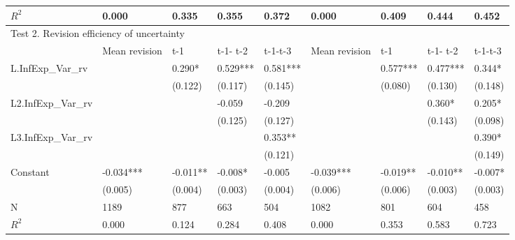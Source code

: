 \documentclass[]{article}
\begin{document}
\begin{adjustbox}{angle=90}
\begin{tabular}{lllllllll}
		$R^2$                  & 0.000         & 0.335     & 0.355    & 0.372    & 0.000         & 0.409     & 0.444     & 0.452     \\
		\hline 
		\multicolumn{9}{l}{Test 2. Revision efficiency of uncertainty}                                                            \\
		\hline 
		& Mean revision & t-1       & t-1- t-2 & t-1-t-3  & Mean revision & t-1       & t-1- t-2  & t-1-t-3   \\
		\hline 
		L.InfExp\_Var\_rv   &               & 0.290*    & 0.529*** & 0.581*** &               & 0.577***  & 0.477***  & 0.344*    \\
		&               & (0.122)   & (0.117)  & (0.145)  &               & (0.080)   & (0.130)   & (0.148)   \\
		L2.InfExp\_Var\_rv  &               &           & -0.059   & -0.209   &               &           & 0.360*    & 0.205*    \\
		&               &           & (0.125)  & (0.127)  &               &           & (0.143)   & (0.098)   \\
		L3.InfExp\_Var\_rv  &               &           &          & 0.353**  &               &           &           & 0.390*    \\
		&               &           &          & (0.121)  &               &           &           & (0.149)   \\
		Constant              & -0.034***     & -0.011**  & -0.008*  & -0.005   & -0.039***     & -0.019**  & -0.010**  & -0.007*   \\
		& (0.005)       & (0.004)   & (0.003)  & (0.004)  & (0.006)       & (0.006)   & (0.003)   & (0.003)   \\
		\hline 
		N                   & 1189          & 877       & 663      & 504      & 1082          & 801       & 604       & 458       \\
	$R^2$                 & 0.000         & 0.124     & 0.284    & 0.408    & 0.000         & 0.353     & 0.583     & 0.723    \\
		\hline 
	\end{tabular}
\end{adjustbox}
\end{document}
